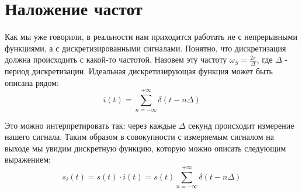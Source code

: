 \section{Наложение частот}
Как мы уже говорили, в реальности нам приходится работать не с непрерывными функциями, а с дискретизированными сигналами. Понятно, что дискретизация должна происходить с какой-то частотой. Назовем эту частоту $\omega_S = \frac{2\pi}{\Delta}$, где $\Delta$ - период дискретизации. Идеальная дискретизирующая функция может быть описана рядом:
\begin{equation}
    i(t) = \sum \limits_{n = - \infty}^{+\infty} \delta\left(t - n\Delta\right)
    \label{eq:tact}
\end{equation}

Это можно интерпретировать так: через каждые $\Delta$ секунд происходит измерение нашего сигнала. Таким образом в совокупности с измеряемым сигналом на выходе мы увидим дискретную функцию, которую можно описать следующим выражением:
\begin{equation}
    s_i(t) = s(t)\cdot i(t) = s(t)\sum \limits_{n = - \infty}^{+\infty} \delta\left(t - n\Delta\right)
    \label{eq:discreted}
\end{equation}

